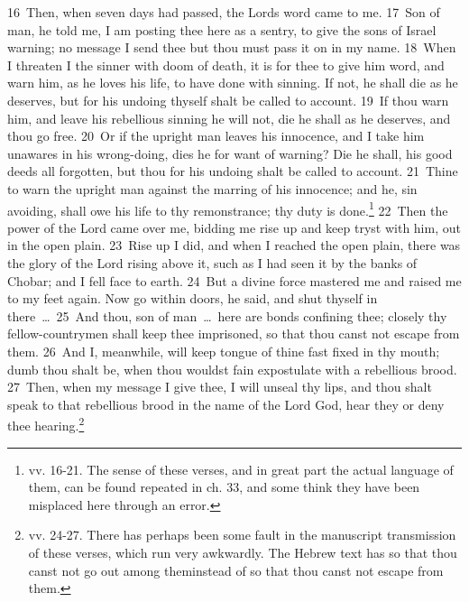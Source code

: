 \documentclass[10pt]{book} %
\begin{document}
\textcolor{benred8}{16}~Then, when seven days had passed, the Lord\textquotesingle s word came to me. \textcolor{benred8}{17}~Son of man, he told me, I am posting thee here as a sentry, to give the sons of Israel warning; no message I send thee but thou must pass it on in my name. \textcolor{benred8}{18}~When I threaten I the sinner with doom of death, it is for thee to give him word, and warn him, as he loves his life, to have done with sinning. If not, he shall die as he deserves, but for his undoing thyself shalt be called to account. \textcolor{benred8}{19}~If thou warn him, and leave his rebellious sinning he will not, die he shall as he deserves, and thou go free. \textcolor{benred8}{20}~Or if the upright man leaves his innocence, and I take him unawares in his wrong-doing, dies he for want of warning? Die he shall, his good deeds all forgotten, but thou for his undoing shalt be called to account. \textcolor{benred8}{21}~Thine to warn the upright man against the marring of his innocence; and he, sin avoiding, shall owe his life to thy remonstrance; thy duty is done.\footnote[5]{vv. 16-21. The sense of these verses, and in great part the actual language of them, can be found repeated in ch. 33, and some think they have been misplaced here through an error.}
\textcolor{benred8}{22}~Then the power of the Lord came over me, bidding me rise up and keep tryst with him, out in the open plain. \textcolor{benred8}{23}~Rise up I did, and when I reached the open plain, there was the glory of the Lord rising above it, such as I had seen it by the banks of Chobar; and I fell face to earth. \textcolor{benred8}{24}~But a divine force mastered me and raised me to my feet again. Now go within doors, he said, and shut thyself in there~\ldots\  \textcolor{benred8}{25}~And thou, son of man~\ldots\  here are bonds confining thee; closely thy fellow-countrymen shall keep thee imprisoned, so that thou canst not escape from them. \textcolor{benred8}{26}~And I, meanwhile, will keep tongue of thine fast fixed in thy mouth; dumb thou shalt be, when thou wouldst fain expostulate with a rebellious brood. \textcolor{benred8}{27}~Then, when my message I give thee, I will unseal thy lips, and thou shalt speak to that rebellious brood in the name of the Lord God, hear they or deny thee hearing.\footnote[6]{vv. 24-27. There has perhaps been some fault in the manuscript transmission of these verses, which run very awkwardly. The Hebrew text has \textasciigrave so that thou canst not go out among them\textquotesingle  instead of \textasciigrave so that thou canst not escape from them\textquotesingle .}
\end{document}
